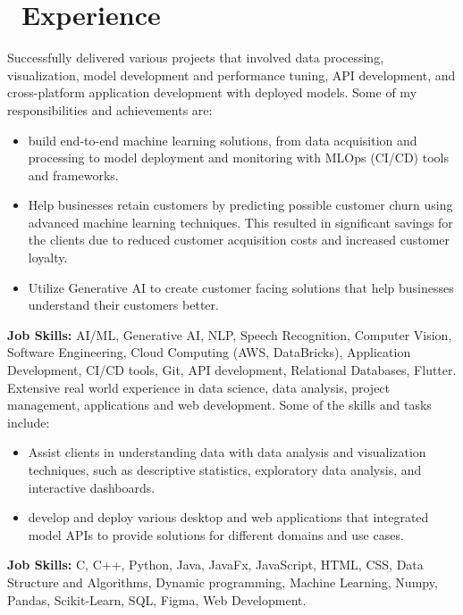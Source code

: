 \section{\texorpdfstring{\faHistory}{}\ Experience}

Successfully delivered various projects that involved data processing, visualization, model development and performance tuning, API development, and cross-platform application development with deployed models. Some of my responsibilities and achievements are:
\begin{itemize}[parsep=0.5ex]
    \item {build end-to-end machine learning solutions, from data acquisition and processing to model deployment and monitoring with MLOps (CI/CD) tools and frameworks.}
    \item {Help businesses retain customers by predicting possible customer churn using advanced machine learning techniques. This resulted in significant savings for the clients due to reduced customer acquisition costs and increased customer loyalty.}
    \item {Utilize Generative AI to create customer facing solutions that help businesses understand their customers better.}
\end{itemize}
\small{\textbf{Job Skills:}
    AI/ML, Generative AI, NLP, Speech Recognition, Computer Vision, Software Engineering, Cloud Computing (AWS, DataBricks), Application Development, CI/CD tools, Git, API development, Relational Databases, Flutter.
}
Extensive real world experience in data science, data analysis, project management, applications and web development. Some of the skills and tasks include:
\begin{itemize}[parsep=0.5ex]
    \item {Assist clients in understanding data with data analysis and visualization techniques, such as descriptive statistics, exploratory data analysis, and interactive dashboards.}
          \item{develop and deploy various desktop and web applications that integrated model APIs to provide solutions for different domains and use cases.}
\end{itemize}

\small{\textbf{Job Skills:}
    C, C++, Python, Java, JavaFx, JavaScript, HTML, CSS, Data Structure and Algorithms, Dynamic programming, Machine Learning, Numpy, Pandas, Scikit-Learn, SQL, Figma, Web Development.
}